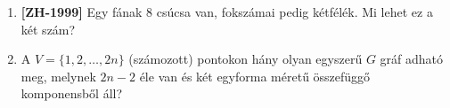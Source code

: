 \documentclass[a4paper,12pt]{article}
\begin{document}
\begin{enumerate}

        \item \textbf{[ZH-1999]} Egy fának $8$ csúcsa van, fokszámai pedig kétfélék. Mi lehet ez a két szám?
        
        
        \item A $V=\{1,2, \ldots, 2n \}$ (számozott) pontokon hány olyan egyszerű $G$ gráf adható meg, melynek $2n-2$ éle van és két egyforma méretű összefüggő komponensből áll?
        



\end{enumerate}
\end{document}
